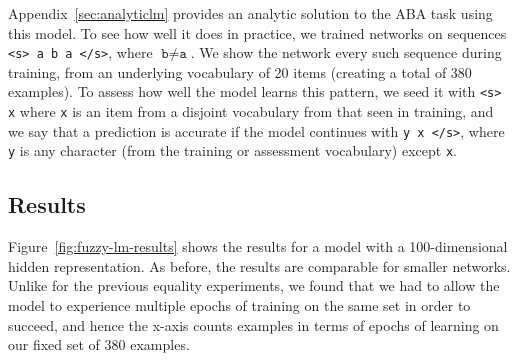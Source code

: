 \documentclass{article}
\newcommand{\Figref}[1]{Figure~\ref{#1}}
\newcommand{\Appref}[1]{Appendix~\ref{#1}}
\begin{document}
\Appref{sec:analyticlm} provides an analytic solution to the ABA task using this model.  To see how well it does in practice, we trained networks on sequences \texttt{<s> a b a </s>}, where $\texttt{b} \neq \texttt{a}$. We show the network every such sequence during training, from an underlying vocabulary of 20 items (creating a total of 380 examples). To assess how well the model learns this pattern, we seed it with \texttt{<s> x} where \texttt{x} is an item from a disjoint vocabulary from that seen in training, and we say that a prediction is accurate if the model continues with \texttt{y x </s>}, where \texttt{y} is any character (from the training or assessment vocabulary) except \texttt{x}.


\subsection{Results}

\Figref{fig:fuzzy-lm-results} shows the results for a model with a 100-dimensional hidden representation. As before, the results are comparable for smaller networks. Unlike for the previous equality experiments, we found that we had to allow the model to experience multiple epochs of training on the same set in order to succeed, and hence the x-axis counts examples in terms of epochs of learning on our fixed set of 380 examples.
\end{document}

